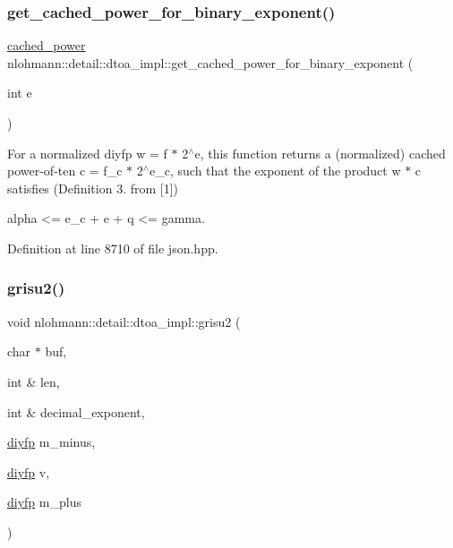 \subsubsection{\texorpdfstring{get\+\_\+cached\+\_\+power\+\_\+for\+\_\+binary\+\_\+exponent()}{get\_cached\_power\_for\_binary\_exponent()}}
{\footnotesize\ttfamily \hyperlink{structnlohmann_1_1detail_1_1dtoa__impl_1_1cached__power}{cached\+\_\+power} nlohmann\+::detail\+::dtoa\+\_\+impl\+::get\+\_\+cached\+\_\+power\+\_\+for\+\_\+binary\+\_\+exponent (\begin{DoxyParamCaption}\item[{int}]{e }\end{DoxyParamCaption})\hspace{0.3cm}{\ttfamily [inline]}}

For a normalized diyfp w = f $\ast$ 2$^\wedge$e, this function returns a (normalized) cached power-\/of-\/ten c = f\+\_\+c $\ast$ 2$^\wedge$e\+\_\+c, such that the exponent of the product w $\ast$ c satisfies (Definition 3. from \mbox{[}1\mbox{]}) \begin{DoxyVerb} alpha <= e_c + e + q <= gamma.\end{DoxyVerb}
 

Definition at line 8710 of file json.\+hpp.

\mbox{\label{namespacenlohmann_1_1detail_1_1dtoa__impl_a05b681dcb8569b9784c6dccfadb01633}} 
\subsubsection{\texorpdfstring{grisu2()}{grisu2()}\hspace{0.1cm}{\footnotesize\ttfamily [1/2]}}
{\footnotesize\ttfamily void nlohmann\+::detail\+::dtoa\+\_\+impl\+::grisu2 (\begin{DoxyParamCaption}\item[{char $\ast$}]{buf,  }\item[{int \&}]{len,  }\item[{int \&}]{decimal\+\_\+exponent,  }\item[{\hyperlink{structnlohmann_1_1detail_1_1dtoa__impl_1_1diyfp}{diyfp}}]{m\+\_\+minus,  }\item[{\hyperlink{structnlohmann_1_1detail_1_1dtoa__impl_1_1diyfp}{diyfp}}]{v,  }\item[{\hyperlink{structnlohmann_1_1detail_1_1dtoa__impl_1_1diyfp}{diyfp}}]{m\+\_\+plus }\end{DoxyParamCaption})\hspace{0.3cm}{\ttfamily [inline]}}

